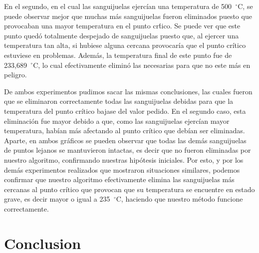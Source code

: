 \documentclass[10pt, a4paper]{article}
\begin{document}
En el segundo, en el cual las sanguijuelas ejerc\'ian una temperatura de  500\hspace{-1.5mm}$\phantom{a}^{\circ}$C, se puede observar mejor que muchas m\'as sanguijuelas fueron eliminados puesto que provocaban una mayor temperatura en el punto cr\'tico. Se puede ver que este punto qued\'o totalmente despejado de sanguijuelas puesto que, al ejercer una temperatura tan alta, si hubiese alguna cercana provocar\'ia que el punto cr\'itico estuviese en problemas. Adem\'as, la temperatura final de este punto fue de 233,689\hspace{-1.5mm}$\phantom{a}^{\circ}$C, lo cual efectivamente elimin\'o las necesarias para que no este m\'as en peligro. 

De ambos experimentos pudimos sacar las mismas conclusiones, las cuales fueron que se eliminaron correctamente todas las sanguijuelas debidas para que la temperatura del punto cr\'itico bajase del valor pedido. En el segundo caso, esta eliminaci\'on fue mayor debido a que, como las sanguijuelas ejerc\'ian mayor temperatura, hab\'ian m\'as afectando al punto cr\'itico que deb\'ian ser eliminadas. Aparte, en ambos gr\'aficos se pueden observar que todas las dem\'as sanguijuelas de puntos lejanos se mantuvieron intactas, es decir que no fueron eliminadas por nuestro algoritmo, confirmando nuestras hip\'otesis iniciales. Por esto, y por los dem\'as experimentos realizados que mostraron situaciones similares, podemos confirmar que nuestro algoritmo efectivamente elimina las sanguijuelas m\'as cercanas al punto cr\'itico que provocan que su temperatura se encuentre en estado grave, es decir mayor o igual a 235\hspace{-1.5mm}$\phantom{a}^{\circ}$C, haciendo que nuestro m\'etodo funcione correctamente. 

\newpage
\section{Conclusion}
\end{document}
